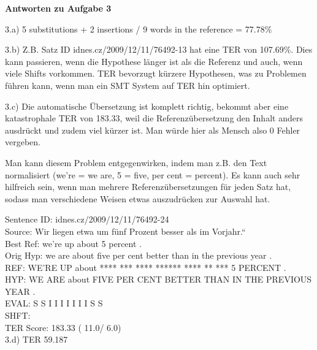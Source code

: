 \documentclass[12pt,fleqn]{article}
\begin{document}
\begin{enumerate}
\begin{enumerate}
\end{enumerate} 


\textbf{Antworten zu Aufgabe 3} 

\vspace{0.5cm} 
3.a) 5 substitutions + 2 insertions / 9 words in the reference = 77.78\%

\vspace{0.5cm} 
3.b) Z.B. Satz ID idnes.cz/2009/12/11/76492-13 hat eine TER von 107.69\%. Dies kann passieren, wenn die Hypothese länger ist als die Referenz und auch, wenn viele Shifts vorkommen. TER bevorzugt kürzere Hypothesen, was zu Problemen führen kann, wenn man ein SMT System auf TER hin optimiert.

\vspace{0.5cm} 
3.c)  Die automatische Übersetzung ist komplett richtig, bekommt aber eine katastrophale TER von 183.33, weil die Referenzübersetzung den Inhalt anders ausdrückt und zudem viel kürzer ist. Man würde hier als Mensch also 0 Fehler vergeben.

\vspace{0.5cm} 
Man kann diesem Problem entgegenwirken, indem man z.B. den Text normalisiert (we’re = we are, 5 = five, per cent = percent). Es kann auch sehr hilfreich sein, wenn man mehrere Referenzübersetzungen für jeden Satz hat, sodass man verschiedene Weisen etwas auszudrücken zur Auswahl hat.

\vspace{0.5cm} 
Sentence ID: idnes.cz/2009/12/11/76492-24 \\ 
Source:   Wir liegen etwa um fünf Prozent besser als im Vorjahr.“ \\ 
Best Ref: we're up about 5 percent . \\ 
Orig Hyp: we are about five per cent better than in the previous year . \\ 

\vspace{0.5cm} 
REF:  WE'RE UP  about **** *** **** ****** **** ** *** 5        PERCENT . \\ 
HYP:  WE    ARE about FIVE PER CENT BETTER THAN IN THE PREVIOUS YEAR    . \\ 
EVAL: S     S         I    I   I    I      I    I  I   S        S         \\ 
SHFT:                                                                    \\
TER Score: 183.33 ( 11.0/  6.0) \\ 

\vspace{0.5cm} 
3.d) TER 59.187


\end{enumerate}
\end{document}

